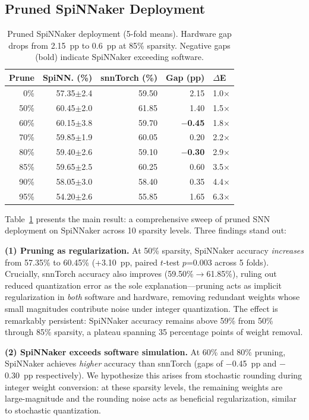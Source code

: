 \documentclass[sigconf,nonacm=false]{acmart}
\begin{document}
\subsection{Pruned SpiNNaker Deployment}

\begin{table}[t]
\caption{Pruned SpiNNaker deployment (5-fold means). Hardware gap drops from 2.15~pp to 0.6~pp at 85\% sparsity. Negative gaps (bold) indicate SpiNNaker exceeding software.}
\label{tab:pruned_spinnaker}
\small
\begin{tabular}{@{}rrrrl@{}}
\toprule
Prune & SpiNN. (\%) & snnTorch (\%) & Gap (pp) & $\Delta$E \\
\midrule
0\% & 57.35$\pm$2.4 & 59.50 & 2.15 & 1.0$\times$ \\
50\% & 60.45$\pm$2.0 & 61.85 & 1.40 & 1.5$\times$ \\
60\% & 60.15$\pm$3.8 & 59.70 & \textbf{$-$0.45} & 1.8$\times$ \\
70\% & 59.85$\pm$1.9 & 60.05 & 0.20 & 2.2$\times$ \\
80\% & 59.40$\pm$2.6 & 59.10 & \textbf{$-$0.30} & 2.9$\times$ \\
85\% & 59.65$\pm$2.5 & 60.25 & 0.60 & 3.5$\times$ \\
90\% & 58.05$\pm$3.0 & 58.40 & 0.35 & 4.4$\times$ \\
95\% & 54.20$\pm$2.6 & 55.85 & 1.65 & 6.3$\times$ \\
\bottomrule
\end{tabular}
\end{table}

Table~\ref{tab:pruned_spinnaker} presents the main result: a comprehensive sweep of pruned SNN deployment on SpiNNaker across 10 sparsity levels.
Three findings stand out:

\textbf{(1) Pruning as regularization.}
At 50\% sparsity, SpiNNaker accuracy \emph{increases} from 57.35\% to 60.45\% (+3.10~pp, paired $t$-test $p$=0.003 across 5 folds).
Crucially, snnTorch accuracy also improves (59.50\%$\to$61.85\%), ruling out reduced quantization error as the sole explanation---pruning acts as implicit regularization in \emph{both} software and hardware, removing redundant weights whose small magnitudes contribute noise under integer quantization.
The effect is remarkably persistent: SpiNNaker accuracy remains above 59\% from 50\% through 85\% sparsity, a plateau spanning 35 percentage points of weight removal.

\textbf{(2) SpiNNaker exceeds software simulation.}
At 60\% and 80\% pruning, SpiNNaker achieves \emph{higher} accuracy than snnTorch (gaps of $-$0.45~pp and $-$0.30~pp respectively).
We hypothesize this arises from stochastic rounding during integer weight conversion: at these sparsity levels, the remaining weights are large-magnitude and the rounding noise acts as beneficial regularization, similar to stochastic quantization.
\end{document}
